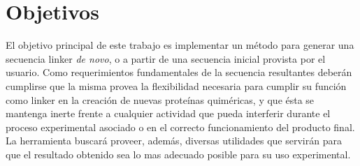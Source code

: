 % 




   
       
       
       

       
       
       
       
       
       
\section{Objetivos}


El objetivo principal de este trabajo es implementar un método para generar una secuencia linker \textit{de novo}, o a partir de una secuencia inicial provista por el usuario. 
Como requerimientos fundamentales de la secuencia resultantes deberán cumplirse que la misma provea la flexibilidad necesaria para cumplir su función como linker en la creación de nuevas proteínas quiméricas, 
y que ésta se mantenga inerte frente a cualquier actividad que pueda interferir durante el proceso experimental asociado o en el correcto funcionamiento del producto final.
La herramienta buscará proveer, además, diversas utilidades que servirán para que el resultado obtenido sea lo mas adecuado posible para su uso experimental. 


